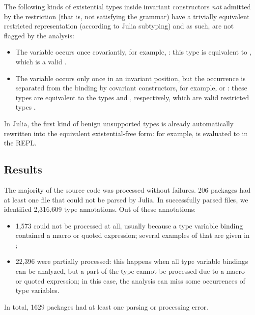 The following kinds of existential types inside invariant constructors
\emph{not} admitted by the restriction (that is, not satisfying the \ty grammar)
have a trivially equivalent restricted representation (according to Julia
subtyping) and as such, are not flagged by the analysis:
\begin{itemize}
  \item The variable occurs once covariantly, for example,
    : this type is equivalent to ,
    which is a valid \ty.
  \item The variable occurs only once in an invariant position, but the occurrence
    is separated from the binding by covariant constructors, for example,
     or
    : these types are equivalent
    to the types  and
    , respectively,
    which are valid restricted types \ty.
\end{itemize}
In Julia, the first kind of benign unsupported types is already automatically 
rewritten into the equivalent existential-free form: for example,
 is evaluated
to  in the REPL.

\subsection{Results}
The majority of the source code was processed without failures.
206 packages had at least one file that could not be parsed by Julia.
In successfully parsed files, we identified 2,316,609 type annotations.
Out of these annotations:
\begin{itemize}
  \item 1,573 could not be processed at all, usually because a type variable
    binding contained a macro or quoted expression;
    several examples of that are given
    in ;
  \item 22,396 were partially processed: this happens when all type variable
    bindings can be analyzed, but a part of the type cannot be processed due to
    a macro or quoted expression; in this case, the analysis can miss 
    some occurrences of type variables.
\end{itemize}
In total, 1629 packages had at least one %
parsing or processing error.

